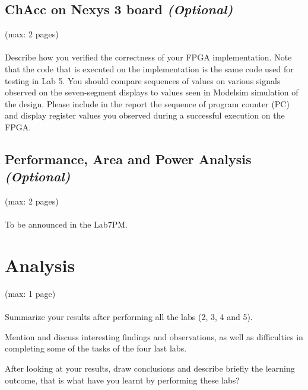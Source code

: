 \documentclass[a4paper,11pt]{article}
\begin{document}
\subsection{ChAcc on Nexys 3 board \emph{(Optional)}}
(max: 2 pages)
\\\\
Describe how you verified the correctness of your FPGA implementation. Note that the code that is executed on the implementation is the same code used for testing in Lab 5. You should compare sequences of values on various signals observed on the seven-segment displays to values seen in Modelsim simulation of the design. Please include in the report the sequence of program counter (PC) and display register values you observed during a successful execution on the FPGA. 

\subsection{Performance, Area and Power Analysis \emph{(Optional)}}
(max: 2 pages)
\\\\
To be announced in the Lab7PM.

\section{Analysis}
(max: 1 page)
\\\\
Summarize your results after performing all the labs (2, 3, 4 and 5).

Mention and discuss interesting findings and observations, as well as difficulties in completing some of the tasks of the four last labs.

After looking at your results, draw conclusions and describe briefly the learning outcome, that is what have you learnt by performing these labs?  
\end{document}
